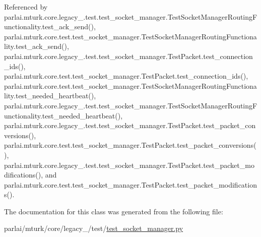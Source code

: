 Referenced by parlai.\+mturk.\+core.\+legacy\+\_.\+test.\+test\+\_\+socket\+\_\+manager.\+Test\+Socket\+Manager\+Routing\+Functionality.\+test\+\_\+ack\+\_\+send(), parlai.\+mturk.\+core.\+test.\+test\+\_\+socket\+\_\+manager.\+Test\+Socket\+Manager\+Routing\+Functionality.\+test\+\_\+ack\+\_\+send(), parlai.\+mturk.\+core.\+legacy\+\_.\+test.\+test\+\_\+socket\+\_\+manager.\+Test\+Packet.\+test\+\_\+connection\+\_\+ids(), parlai.\+mturk.\+core.\+test.\+test\+\_\+socket\+\_\+manager.\+Test\+Packet.\+test\+\_\+connection\+\_\+ids(), parlai.\+mturk.\+core.\+test.\+test\+\_\+socket\+\_\+manager.\+Test\+Socket\+Manager\+Routing\+Functionality.\+test\+\_\+needed\+\_\+heartbeat(), parlai.\+mturk.\+core.\+legacy\+\_.\+test.\+test\+\_\+socket\+\_\+manager.\+Test\+Socket\+Manager\+Routing\+Functionality.\+test\+\_\+needed\+\_\+heartbeat(), parlai.\+mturk.\+core.\+legacy\+\_.\+test.\+test\+\_\+socket\+\_\+manager.\+Test\+Packet.\+test\+\_\+packet\+\_\+conversions(), parlai.\+mturk.\+core.\+test.\+test\+\_\+socket\+\_\+manager.\+Test\+Packet.\+test\+\_\+packet\+\_\+conversions(), parlai.\+mturk.\+core.\+legacy\+\_.\+test.\+test\+\_\+socket\+\_\+manager.\+Test\+Packet.\+test\+\_\+packet\+\_\+modifications(), and parlai.\+mturk.\+core.\+test.\+test\+\_\+socket\+\_\+manager.\+Test\+Packet.\+test\+\_\+packet\+\_\+modifications().



The documentation for this class was generated from the following file\+:\begin{DoxyCompactItemize}
\item 
parlai/mturk/core/legacy\+\_/test/\hyperlink{legacy__2018_2test_2test__socket__manager_8py}{test\+\_\+socket\+\_\+manager.\+py}\end{DoxyCompactItemize}
